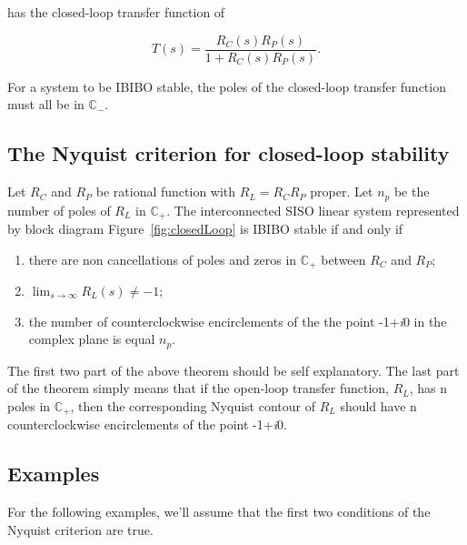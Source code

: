 \noindent has the closed-loop transfer function of

\begin{displaymath}
T(s)= \frac{R_{C}(s)R_{P}(s)}{1+R_{C}(s)R_{P}(s)}.
\end{displaymath}

For a system to be IBIBO stable, the poles of the closed-loop
transfer function must all be in $\mathbb{C}_{-}$.

\subsection{The Nyquist criterion for closed-loop stability}

Let $R_{C}$ and $R_{P}$ be rational function with
$R_{L}=R_{C}R_{P}$ proper.  Let $n_{p}$ be the number of poles of
$R_{L}$ in $\mathbb{C}_{+}$.  The interconnected SISO linear
system represented by block diagram Figure~\ref{fig:closedLoop} is
IBIBO stable if and only if
\begin{enumerate}
\item there are non cancellations of poles and zeros in
$\mathbb{C}_{+}$ between $R_{C}$ and $R_{P}$; \item
$\lim_{s\rightarrow\infty}R_{L}(s)\neq -1$; \item the number of
counterclockwise encirclements of the the point -1+\emph{i}0 in
the complex plane is equal $n_{p}$.
\end{enumerate}

The first two part of the above theorem should be self
explanatory.  The last part of the theorem simply means that if
the open-loop transfer function, $R_{L}$, has n poles in
$\mathbb{C}_{+}$, then the corresponding Nyquist contour of
$R_{L}$ should have n counterclockwise encirclements of the point
-1+\emph{i}0.

\subsection{Examples}

For the following examples, we'll assume that the first two
conditions of the Nyquist criterion are true.

